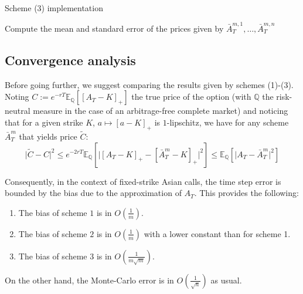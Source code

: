 \documentclass{article}
\begin{document}
\

\begin{algorithm}[H]
\caption{Scheme (3) implementation}
Compute the mean and standard error of the prices given by $\bar A_T^{m, 1}, \dots, \bar A_T^{m, n}$\;
\;
\end{algorithm}

\subsection*{Convergence analysis}

Before going further, we suggest comparing the results given by schemes (1)-(3).
Noting $C := e^{-rT}  \mathbb E_{\mathbb Q} \left[ [ A_T - K ]_+ \right]$ the true price of the option (with $\mathbb Q$
the risk-neutral measure in the case of an arbitrage-free complete market)  and noticing that for a given strike $K$,
$a \mapsto [ a - K ]_+$ is $1$-lipschitz, we have for any scheme $\bar A_T^m$ that yields price $\widetilde C$:
\[
	\vert \widetilde C - C \vert^2
	\leqslant e^{-2rT} \mathbb E_{\mathbb Q} \left[ \vert [ A_T - K ]_+ - [ \bar A_T^m - K ]_+ \vert^2 \right]
	\leqslant \mathbb E_{\mathbb Q} \left[ \vert A_T - \bar A_T^m \vert^2 \right]
\]

\noindent Consequently, in the context of fixed-strike Asian calls, the time step error is bounded
by the bias due to the approximation of $A_T$. This provides the following:
\begin{enumerate}[label=(\roman*)]
\item The bias of scheme $1$ is in $O \left( \frac{1}{m} \right)$.
\item The bias of scheme $2$ is in $O \left( \frac{1}{m} \right)$ with a lower constant than for scheme 1.
\item The bias of scheme $3$ is in $O \left( \frac{1}{m\sqrt{m}} \right)$.
\end{enumerate}

\noindent On the other hand, the Monte-Carlo error is in $O \left( \frac{1}{\sqrt{n}} \right)$ as usual.
\end{document}
